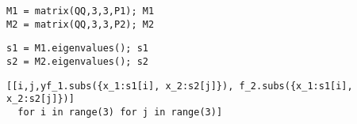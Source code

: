 \documentclass[a4j]{jarticle}
\begin{document}
\begin{verbatim}
M1 = matrix(QQ,3,3,P1); M1
M2 = matrix(QQ,3,3,P2); M2
\end{verbatim}

\begin{verbatim}
s1 = M1.eigenvalues(); s1
s2 = M2.eigenvalues(); s2
\end{verbatim}

\begin{verbatim}
[[i,j,yf_1.subs({x_1:s1[i], x_2:s2[j]}), f_2.subs({x_1:s1[i], x_2:s2[j]})] 
  for i in range(3) for j in range(3)]
\end{verbatim}
\end{document}
